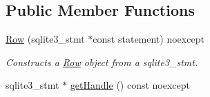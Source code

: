 \subsection*{Public Member Functions}
\begin{DoxyCompactItemize}
\item 
\hypertarget{a00011_ac93d6eec191f8f92ce72f481935d1832}{\hyperlink{a00011_ac93d6eec191f8f92ce72f481935d1832}{Row} (sqlite3\-\_\-stmt $\ast$const statement) noexcept}\label{a00011_ac93d6eec191f8f92ce72f481935d1832}

\begin{DoxyCompactList}\small\item\em Constructs a \hyperlink{a00011}{Row} object from a sqlite3\-\_\-stmt. \end{DoxyCompactList}\item 
\hypertarget{a00011_a0cdd34663266ff8c19ee1313a87d51f0}{sqlite3\-\_\-stmt $\ast$ \hyperlink{a00011_a0cdd34663266ff8c19ee1313a87d51f0}{get\-Handle} () const noexcept}\label{a00011_a0cdd34663266ff8c19ee1313a87d51f0}


\end{DoxyCompactItemize}
